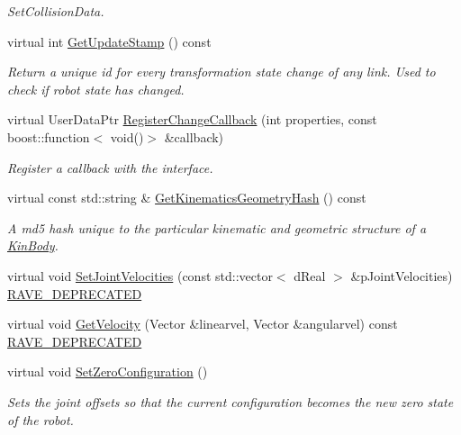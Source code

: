 \begin{DoxyCompactItemize}
\begin{DoxyCompactList}\small\item\em SetCollisionData. \item\end{DoxyCompactList}\item 
virtual int \hyperlink{classOpenRAVE_1_1KinBody_aac16fee68aa354fa24e6de5b8f79b78d}{GetUpdateStamp} () const 
\begin{DoxyCompactList}\small\item\em Return a unique id for every transformation state change of any link. Used to check if robot state has changed. \item\end{DoxyCompactList}\item 
virtual UserDataPtr \hyperlink{classOpenRAVE_1_1KinBody_a4f3de0f5a2b97c622ae9e4ea774cf30d}{RegisterChangeCallback} (int properties, const boost::function$<$ void()$>$ \&callback)
\begin{DoxyCompactList}\small\item\em Register a callback with the interface. \item\end{DoxyCompactList}\item 
virtual const std::string \& \hyperlink{classOpenRAVE_1_1KinBody_a911ecdc66e68c59e2be7eeec162b238a}{GetKinematicsGeometryHash} () const 
\begin{DoxyCompactList}\small\item\em A md5 hash unique to the particular kinematic and geometric structure of a \hyperlink{classOpenRAVE_1_1KinBody}{KinBody}. \item\end{DoxyCompactList}\item 
virtual void \hyperlink{classOpenRAVE_1_1KinBody_ad1f632c1fc4e293b7fd1482c732dd7d2}{SetJointVelocities} (const std::vector$<$ dReal $>$ \&pJointVelocities) \hyperlink{namespaceOpenRAVE_af23fc4c2c72950a8c02f38ef71680bc6}{RAVE\_\-DEPRECATED}
\item 
virtual void \hyperlink{classOpenRAVE_1_1KinBody_a7685100461fe38707668dc3495e05a49}{GetVelocity} (Vector \&linearvel, Vector \&angularvel) const \hyperlink{namespaceOpenRAVE_af23fc4c2c72950a8c02f38ef71680bc6}{RAVE\_\-DEPRECATED}
\item 
virtual void \hyperlink{classOpenRAVE_1_1KinBody_a869f9a89146a89d8248f392c9610b7b7}{SetZeroConfiguration} ()
\begin{DoxyCompactList}\small\item\em Sets the joint offsets so that the current configuration becomes the new zero state of the robot. \item\end{DoxyCompactList}\end{DoxyCompactItemize}
